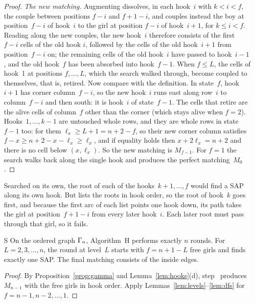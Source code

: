 \begin{proof}
\emph{The new matching.} Augmenting dissolves, in each hook~$i$ with
$k<i<f$, the couple between positions $f-i$ and $f+1-i$, and couples
instead the boy at position~$f-i$ of hook~$i$ to the girl at position
$f-i$ of hook~$i+1$, for $k\le i<f$. Reading along the new couples, the
new hook~$i$ therefore consists of the first $f-i$ cells of the old hook
$i$, followed by the cells of the old hook~$i+1$ from position~$f-i$ on;
the remaining cells of the old hook~$i$ have passed to hook~$i-1$, and
the old hook~$f$ has been absorbed into hook~$f-1$. When $f\le L$, the
cells of hook~1 at positions $f,\ldots,L$, which the search walked
through, become coupled to themselves, that is, retired. Now compare
with the definition. In state~$f$, hook~$i+1$ has corner column~$f-i$, so
the new hook~$i$ runs east along row~$i$ to column~$f-i$ and then south:
it is hook~$i$ of state~$f-1$. The cells that retire are the alive cells
of column~$f$ other than the corner (which stays alive when $f=2$). Hooks~$1,\ldots,k-1$ are untouched whole rows, and they
are whole rows in state~$f-1$ too: for them $\ell_x\ge L+1=n+2-f$, so their
new corner column satisfies $f-x\ge n+2-x-\ell_x\ge\ell_x$, and if equality
holds then $x+2\ell_x=n+2$ and there is no cell below $(x,\ell_x)$. So the
new matching is $M_{f-1}$. For $f=1$ the search walks back along the single
hook and produces the perfect matching~$M_0$.
\end{proof}

Searched on its own, the root of each of the hooks~$k+1,\ldots,f$ would
find a SAP along its own hook. But  lists the roots in hook
order, so the root of hook~$k$ goes first, and because the first arc of
each  list points one hook down, its path takes the girl at
position~$f+1-i$ from every later hook~$i$. Each later root must pass
through that girl, so it fails.

\begin{lthm}{S}
On the ordered graph $\Gamma_n$, Algorithm~H performs exactly $n$ rounds.
For $L=2,3,\ldots,n$, the round at level~$L$ starts with $f=n+1-L$ free
girls and finds exactly one SAP. The final matching consists of the
inside edges.
\end{lthm}

\begin{proof}
By Proposition~\ref{prop:gamma} and Lemma~\ref{lem:hooks}(d), step~
produces $M_{n-1}$ with the free girls in hook order. Apply
Lemmas~\ref{lem:levels}--\ref{lem:dfs} for $f=n-1,n-2,\ldots,1$.
\end{proof}

